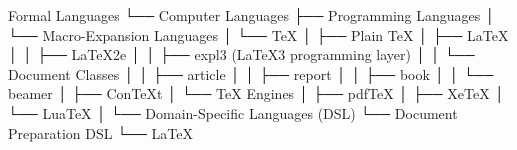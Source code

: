 \documentclass[a4paper]{article}
\title{}
\date{}
\begin{document}
    \maketitle
    Formal Languages
    └── Computer Languages
    ├── Programming Languages
    │ └── Macro-Expansion Languages
    │ └── TeX
    │ ├── Plain TeX
    │ ├── LaTeX
    │ │ ├── LaTeX2e
    │ │ ├── expl3 (LaTeX3 programming layer)
    │ │ └── Document Classes
    │ │ ├── article
    │ │ ├── report
    │ │ ├── book
    │ │ └── beamer
    │ ├── ConTeXt
    │ └── TeX Engines
    │ ├── pdfTeX
    │ ├── XeTeX
    │ └── LuaTeX
    │
    └── Domain-Specific Languages (DSL)
    └── Document Preparation DSL
    └── LaTeX
\end{document}
